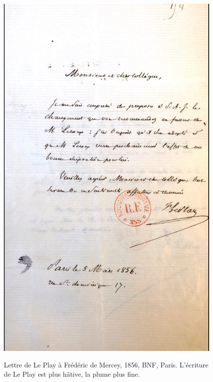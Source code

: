 \begin{figure}[H]
    \centering
    \caption{Lettre de Le Play à Frédéric de Mercey, 1856, BNF, Paris. L'écriture de Le Play est plus hâtive, la plume plus fine.}
    \includegraphics[width=14cm]{images/mercey.JPG}
    \label{mercey}
\end{figure}

